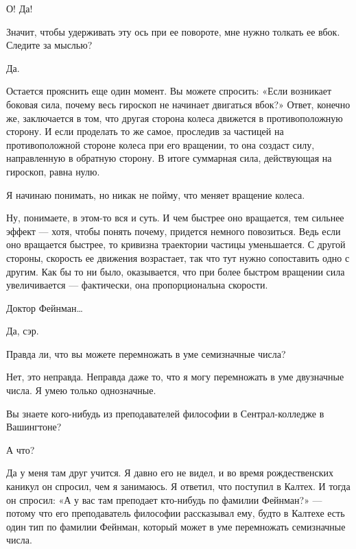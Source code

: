 \documentclass[11pt,oneside]{article}
\begin{document}
О! Да!\par

Значит, чтобы удерживать эту ось при ее повороте, мне нужно толкать ее вбок. Следите за мыслью?\par

Да.\par

Остается прояснить еще один момент. Вы можете спросить: «Если возникает боковая сила, почему весь гироскоп не начинает двигаться вбок?» Ответ, конечно же, заключается в том, что другая сторона колеса движется в противоположную сторону. И если проделать то же самое, проследив за частицей на противоположной стороне колеса при его вращении, то она создаст силу, направленную в обратную сторону. В итоге суммарная сила, действующая на гироскоп, равна нулю.\par

Я начинаю понимать, но никак не пойму, что меняет вращение колеса.\par

Ну, понимаете, в этом-то вся и суть. И чем быстрее оно вращается, тем сильнее эффект --- хотя, чтобы понять почему, придется немного повозиться. Ведь если оно вращается быстрее, то кривизна траектории частицы уменьшается. С другой стороны, скорость ее движения возрастает, так что тут нужно сопоставить одно с другим. Как бы то ни было, оказывается, что при более быстром вращении сила увеличивается --- фактически, она пропорциональна скорости.\par

Доктор Фейнман\ldots{}\par

Да, сэр.\par

Правда ли, что вы можете перемножать в уме семизначные числа?\par

Нет, это неправда. Неправда даже то, что я могу перемножать в уме двузначные числа. Я умею только однозначные.\par

Вы знаете кого-нибудь из преподавателей философии в Сентрал-колледже в Вашингтоне?\par

А что?\par

Да у меня там друг учится. Я давно его не видел, и во время рождественских каникул он спросил, чем я занимаюсь. Я ответил, что поступил в Калтех. И тогда он спросил: «А у вас там преподает кто-нибудь по фамилии Фейнман?» --- потому что его преподаватель философии рассказывал ему, будто в Калтехе есть один тип по фамилии Фейнман, который может в уме перемножать семизначные числа.\par
\end{document}
